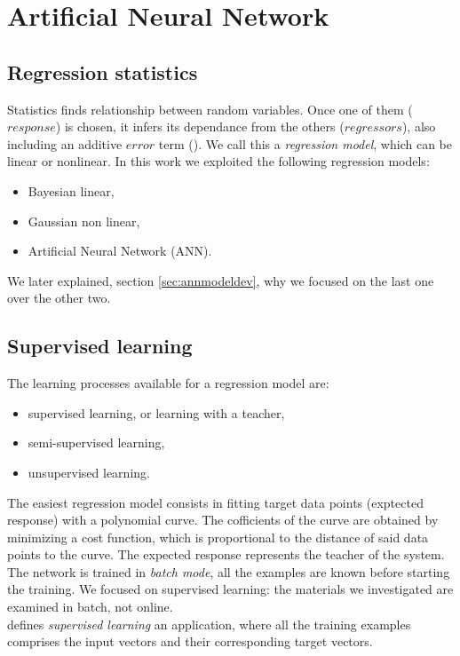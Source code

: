 
\chapter{Artificial Neural Network}
\label{cap:ann}

\section{Regression statistics}
\label{sec:regressionstatistics}

Statistics finds relationship between random variables.
Once one of them ($response$) is chosen, it infers its dependance from the
others ($regressors$), also including an additive $error$ term
(\citet{RefWorks:194}). We call this a \textit{regression model}, which can be
linear or nonlinear.
In this work we exploited the following regression models:
\begin{itemize}
  \item{Bayesian linear,}
  \item{Gaussian non linear,}
  \item{Artificial Neural Network (\acs{ANN}).}
\end{itemize}
We later explained, section \ref{sec:annmodeldev}, why we focused on the last
one over the other two.


\section{Supervised learning}
\label{sec:supervisedlearning}

The learning processes available for a regression model are:

\begin{itemize}
  \item{supervised learning, or learning with a teacher,}
  \item{semi-supervised learning,}
  \item{unsupervised learning.}
\end{itemize}

The easiest regression model consists in fitting target data
points (exptected response) with a polynomial curve.
The cofficients of the curve are obtained by minimizing a cost function, which
is proportional to the distance of said data points to the curve.
The expected response represents the teacher of the system.
The network is trained in \textit{batch mode}, all the examples are known before
starting the training.
We focused on supervised learning: the materials we investigated are examined in
batch, not online.\\
\citet{RefWorks:194} defines \textit{supervised learning} an application, where all the
training examples comprises the input vectors and their corresponding target
vectors.


